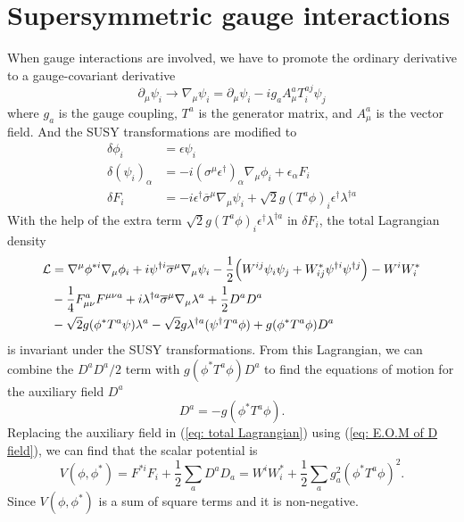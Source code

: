 \documentclass[12pt]{report}
\begin{document}
\section{Supersymmetric gauge interactions}
When gauge interactions are involved, we have to promote the ordinary derivative to a gauge-covariant derivative
\begin{equation}
\partial_{\mu} \psi_{i} \to \nabla_{\mu} \psi_{i} = \partial_{\mu} \psi_{i} - i g_{a} A^{a}_{\mu} T^{aj}_{i} \psi_{j}
\end{equation}
where $g_{a}$ is the gauge coupling, $T^{a}$ is the generator matrix, and $A^{a}_{\mu}$ is the vector field.
And the SUSY transformations are modified to
\begin{align} \label{eq: total Lagrangian}
\delta \phi_{i} &= \epsilon \psi_{i}\\
\delta (\psi_{i})_{\alpha} &= - i (\sigma^{\mu} \epsilon^{\dag})_{\alpha} \nabla_{\mu} \phi_{i} + \epsilon_{\alpha} F_{i}\\
\delta F_{i} &= -i \epsilon^{\dag} \overline{\sigma}^{\mu} \nabla_{\mu} \psi_{i} + \sqrt{2} g (T^{a} \phi)_{i} \epsilon^{\dag} \lambda^{\dag a}
\end{align}
With the help of the extra term $\sqrt{2} g (T^{a} \phi)_{i} \epsilon^{\dag} \lambda^{\dag a}$ in $\delta F_{i}$, the total Lagrangian density
\begin{align} \label{eq: Lagrangian for gauge theory}
\mathcal{L} &= \nabla^{\mu} \phi^{*i} \nabla_{\mu} \phi_{i} + i \psi^{\dag i} \overline{\sigma}^{\mu} \nabla_{\mu} \psi_{i} -\frac{1}{2} \Big( W^{ij} \psi_{i} \psi_{j} + W^{*}_{ij} \psi^{\dag i} \psi^{\dag j} \Big) - W^{i} W^{*}_{i} \notag \\
& -\frac{1}{4} F^{a}_{\mu \nu} F^{\mu \nu a} + i \lambda^{\dag a} \overline{\sigma}^{\mu} \nabla_{\mu} \lambda^{a} + \frac{1}{2} D^{a} D^{a} \notag \\
& -\sqrt{2} g (\phi^{*} T^{a} \psi) \lambda^{a} - \sqrt{2} g \lambda^{\dag a} (\psi^{\dag} T^{a} \phi) + g(\phi^{*} T^{a} \phi) D^{a}
\end{align}
is invariant under the SUSY transformations.
From this Lagrangian, we can combine the $D^{a} D^{a} / 2$ term with $g (\phi^{*} T^{a} \phi) D^{a}$ to find the equations of motion for the auxiliary field $D^{a}$
\begin{equation} \label{eq: E.O.M of D field}
D^{a} = - g (\phi^{*} T^{a} \phi) .
\end{equation}
Replacing the auxiliary field in (\ref{eq: total Lagrangian}) using (\ref{eq: E.O.M of D field}), we can find that the scalar potential is
\begin{equation} \label{eq: scalar potential}
V(\phi, \phi^{*}) = F^{*i} F_{i} + \frac{1}{2} \sum_{a} D^{a} D_{a} = W^{i} W^{*}_{i} + \frac{1}{2} \sum_{a} g^{2}_{a} (\phi^{*} T^{a} \phi)^{2} .
\end{equation}
Since $V(\phi, \phi^{*})$ is a sum of square terms and it is non-negative.
\end{document}
